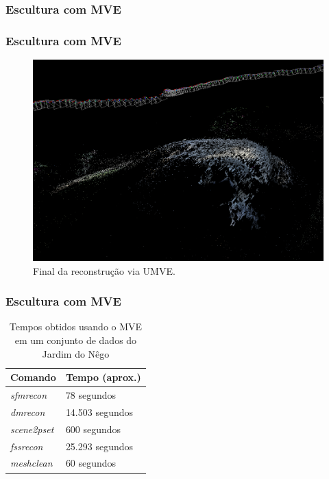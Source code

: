 \documentclass[table, usenames, svgnames, xcolor=dvipsnames]{beamer}
\begin{document}
\begin{frame}
\frametitle{\textbf{Escultura com MVE}}
	\begin{center}
	\end{center}
\end{frame}

\begin{frame}
	\frametitle{\textbf{Escultura com MVE}}
		\begin{figure}[!h]
		\centering
		\includegraphics[width=0.9\linewidth]{figs/umvedense.png}
		\caption{%
		Final da reconstrução via UMVE.
		}\label{fig:UMVEdense}
	\end{figure} 
\end{frame}

\begin{frame}
\frametitle{\textbf{Escultura com MVE}}
	\begin{table}[!h]
	\centering
	\caption{Tempos obtidos usando o MVE em um conjunto de dados do Jardim do Nêgo}
	\label{tab:mveSapo}
		\begin{tabular}{|l|l|}
			\hline
			Comando            & Tempo (aprox.)    \\ \hline
			\emph{sfmrecon}  & 78 segundos     \\ \hline
			\emph{dmrecon}   & 14.503 segundos \\ \hline
			\emph{scene2pset} & 600 segundos    \\ \hline
			\emph{fssrecon}  & 25.293 segundos \\ \hline
			\emph{meshclean} & 60 segundos     \\ \hline
		\end{tabular}
	\end{table}
\end{frame}
\end{document}
